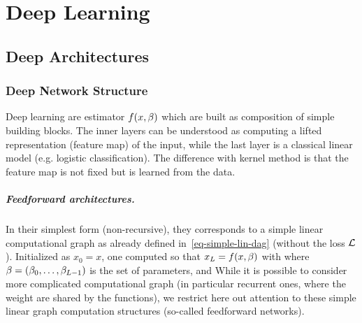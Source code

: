 
\chapter{Deep Learning}
\label{c-deep-learning}



\section{Deep Architectures}
\label{sec-deepnet-discr}

\subsection{Deep Network Structure}
\label{sec-deep-structure}

Deep learning are estimator $f(x,\beta)$ which are built as composition of simple building blocks.
%
The inner layers can be understood as computing a lifted representation (feature map) of the input, while the last layer is a classical linear model (e.g. logistic classification). The difference with kernel method is that the feature map is not fixed but is learned from the data. 

\paragraph{Feedforward architectures.}

In their simplest form (non-recursive), they corresponds to a simple linear computational graph as already defined in~\eqref{eq-simple-lin-dag} (without the loss $\mathcal{L}$). Initialized as $x_0=x$, one computed
so that $x_L=f(x,\beta)$ with 
where $\beta=(\beta_0,\ldots,\beta_{L-1})$ is the set of parameters, and 
%
While it is possible to consider more complicated computational graph (in particular recurrent ones, where the weight are shared by the functions), we restrict here out attention to these simple linear graph computation structures (so-called feedforward networks).


